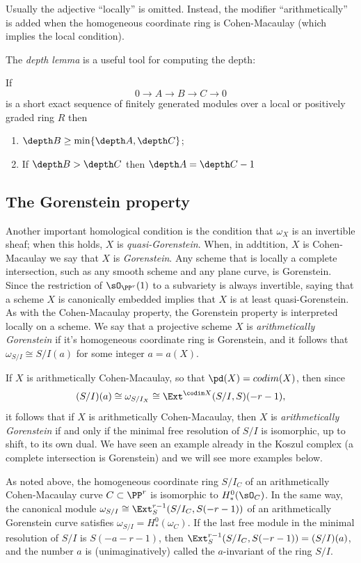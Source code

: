 Usually the adjective ``locally'' is omitted. Instead, the 
modifier ``arithmetically'' is added when the homogeneous coordinate ring is Cohen-Macaulay (which implies the local condition).

The \emph{depth lemma} \cite[***]{Eisenbud1995} is a useful tool for computing the depth:

\begin{lemma}\label{depth lemma}
If 
$$
0\to A\to B\to C\to 0
$$
is a short exact sequence of finitely generated modules over a local or positively graded ring $R$ then
\begin{enumerate}
\item $\depth B \geq \min\{\depth A, \depth C\}$;
 \item If $\depth B>\depth C$ then $\depth A = \depth C -1$
\end{enumerate}
\end{lemma}


\subsection{The Gorenstein property} 
Another important homological condition is the condition that $\omega_X$ is an invertible sheaf; when this holds, $X$ is \emph{quasi-Gorenstein}. When, in addtition, $X$ is Cohen-Macaulay we say that $X$ is \emph{Gorenstein}. Any scheme that is locally a complete intersection, such as any smooth scheme and any plane curve, is Gorenstein. Since the restriction
of $\sO_{\PP^r}(1)$ to a subvariety is always invertible, saying that a scheme $X$ is canonically embedded implies that
$X$ is at least quasi-Gorenstein. As with the Cohen-Macaulay property, the Gorenstein property is interpreted locally
on a scheme. We say that a projective scheme $X$ is \emph{arithmetically Gorenstein}
if it's homogeneous coordinate ring is Gorenstein, and it follows that $\omega_{S/I} \cong S/I(a)$ for some integer $a = a(X)$.

If $X$ is arithmetically Cohen-Macaulay, so that
$\pd(X) = codim(X)$,  then since 
$$
(S/I)(a) \cong \omega_{S/I_X} \cong \Ext^{\codim X}(S/I, S)(-r-1),
$$
it follows that if $X$ is arithmetically Cohen-Macaulay, then $X$ is  \emph{arithmetically Gorenstein} if and only if
the  minimal free resolution of $S/I$ is isomorphic, up to shift, to its own dual. We have seen an example already
in the Koszul complex (a complete intersection is Gorenstein) and we will see more examples
below.


 As noted above, the homogeneous coordinate ring $S/I_C$ of an arithmetically Cohen-Macaulay curve $C\subset \PP^r$ is isomorphic
 to $H^0_*(\sO_C)$. In the same way, the canonical module $\omega_{S/I} \cong \Ext_S^{r-1}(S/I_C, S(-r-1))$ of an arithmetically Gorenstein curve satisfies
 $\omega_{S/I} = H^0_*(\omega_C)$.  If the last free module in the minimal resolution of $S/I$ is $S(-a-r-1)$,
 then $\Ext_S^{r-1}(S/I_C, S(-r-1)) = (S/I)(a)$, and the number $a$ is (unimaginatively) called the $a$-invariant
 of the ring $S/I$.
 
